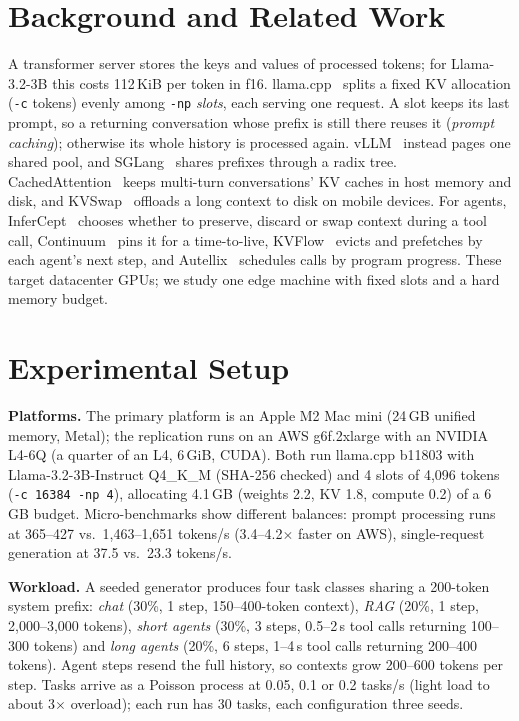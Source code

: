 \documentclass[conference,letterpaper]{IEEEtran}
\begin{document}
\section{Background and Related Work}
A transformer server stores the keys and values of processed tokens; for Llama-3.2-3B this costs 112\,KiB per token in f16. llama.cpp~\cite{llamacpp} splits a fixed KV allocation (\texttt{-c} tokens) evenly among \texttt{-np} \emph{slots}, each serving one request. A slot keeps its last prompt, so a returning conversation whose prefix is still there reuses it (\emph{prompt caching}); otherwise its whole history is processed again. vLLM~\cite{kwon2023vllm} instead pages one shared pool, and SGLang~\cite{zheng2024sglang} shares prefixes through a radix tree. CachedAttention~\cite{gao2024cachedattention} keeps multi-turn conversations' KV caches in host memory and disk, and KVSwap~\cite{zhang2025kvswap} offloads a long context to disk on mobile devices. For agents, InferCept~\cite{abhyankar2024infercept} chooses whether to preserve, discard or swap context during a tool call, Continuum~\cite{li2025continuum} pins it for a time-to-live, KVFlow~\cite{pan2025kvflow} evicts and prefetches by each agent's next step, and Autellix~\cite{luo2025autellix} schedules calls by program progress. These target datacenter GPUs; we study one edge machine with fixed slots and a hard memory budget.

\section{Experimental Setup}
\textbf{Platforms.} The primary platform is an Apple M2 Mac mini (24\,GB unified memory, Metal); the replication runs on an AWS g6f.2xlarge with an NVIDIA L4-6Q (a quarter of an L4, 6\,GiB, CUDA). Both run llama.cpp b11803 with Llama-3.2-3B-Instruct Q4\_K\_M (SHA-256 checked) and 4 slots of 4,096 tokens (\texttt{-c 16384 -np 4}), allocating 4.1\,GB (weights 2.2, KV 1.8, compute 0.2) of a 6\,GB budget. Micro-benchmarks show different balances: prompt processing runs at 365--427 vs.\ 1,463--1,651 tokens/s (3.4--4.2$\times$ faster on AWS), single-request generation at 37.5 vs.\ 23.3 tokens/s.

\textbf{Workload.} A seeded generator produces four task classes sharing a 200-token system prefix: \emph{chat} (30\%, 1 step, 150--400-token context), \emph{RAG} (20\%, 1 step, 2,000--3,000 tokens), \emph{short agents} (30\%, 3 steps, 0.5--2\,s tool calls returning 100--300 tokens) and \emph{long agents} (20\%, 6 steps, 1--4\,s tool calls returning 200--400 tokens). Agent steps resend the full history, so contexts grow 200--600 tokens per step. Tasks arrive as a Poisson process at 0.05, 0.1 or 0.2 tasks/s (light load to about 3$\times$ overload); each run has 30 tasks, each configuration three seeds.
\end{document}
